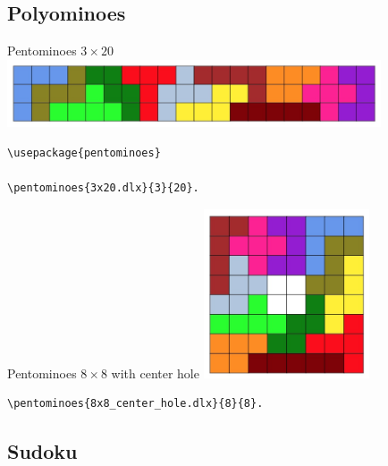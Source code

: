 \documentclass{beamer}
\begin{document}
\subsection{Polyominoes}

%

%
\begin{frame}[fragile]{Pentominoes $3\times20$}
\centering\includegraphics[height=2cm]{3x20.jpg}
\begin{verbatim}
\usepackage{pentominoes}

\pentominoes{3x20.dlx}{3}{20}.
\end{verbatim}  
\end{frame}

%
\begin{frame}[fragile]{Pentominoes $8\times8$ with center hole}
\centering\includegraphics[height=5cm]{8x8.jpg}
\begin{verbatim}
\pentominoes{8x8_center_hole.dlx}{8}{8}.
\end{verbatim}  
\end{frame}

\subsection{Sudoku}
\end{document}

